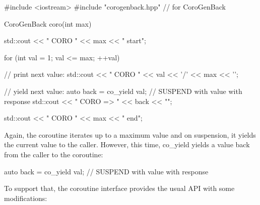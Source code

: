 
\begin{cpp}
#include <iostream>
#include "corogenback.hpp" // for CoroGenBack

CoroGenBack coro(int max)
{
	std::cout << "              CORO " << max << " start\n";
	
	for (int val = 1; val <= max; ++val) {
		// print next value:
		std::cout << " CORO " << val << '/' << max << '\n';
		
		// yield next value:
		auto back = co_yield val; // SUSPEND with value with response
		std::cout << "           CORO => " << back << "\n";
	}
	
	std::cout << "             CORO " << max << " end\n";
}
\end{cpp}

Again, the coroutine iterates up to a maximum value and on suspension, it yields the current value to the caller. However, this time, co\_yield yields a value back from the caller to the coroutine:

\begin{cpp}
auto back = co_yield val; // SUSPEND with value with response
\end{cpp}

To support that, the coroutine interface provides the usual API with some modifications:


